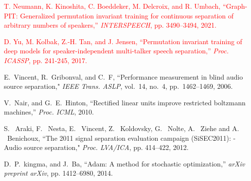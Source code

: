 \documentclass[honka]{nitkagawathesis}%
\newcommand{\red}[1]{\textcolor{red}{#1}}
\begin{document}
\begin{thebibliography}{99}
  \red{T. Neumann, K. Kinoshita, C. Boeddeker, M. Delcroix, and R. Umbach, ``Graph-PIT: Generalized permutation invariant training for continuous separation of arbitrary numbers of speakers,'' {\em INTERSPEECH}, pp. 3490--3494, 2021.}

  \red{ D. Yu, M. Kolbak, Z.-H. Tan, and J. Jensen, ``Permutation invariant training of deep models for speaker-independent multi-talker speech separation,'' {\em Proc. ICASSP}, pp. 241-245, 2017. }

  E.~Vincent, R.~Gribonval, and C.~F, ``Performance measurement in blind audio source separation," {\em IEEE Trans. ASLP}, vol.~14, no.~4, pp.~1462--1469, 2006.
  
  V.~Nair, and G.~E.~Hinton, ``Rectified linear units improve restricted boltzmann machines,'' 
  {\em Proc. ICML}, 2010.
  
  S. ~Araki, F. ~Nesta, E. ~Vincent, Z. ~Koldovsky, G. ~Nolte, A. ~Ziehe and A. ~Benichoux, ``The 2011 signal separation evaluation campaign (SiSEC2011): -Audio source separation," {\em Proc. LVA/ICA}, pp. 414--422, 2012.
  
  D.~P.~kingma, and J.~Ba, ``Adam: A method for stochastic optimization,''
  {\em arXiv preprint arXiv}, pp. 1412--6980, 2014.
  
\end{thebibliography}


% 



\appendix


\end{document}
